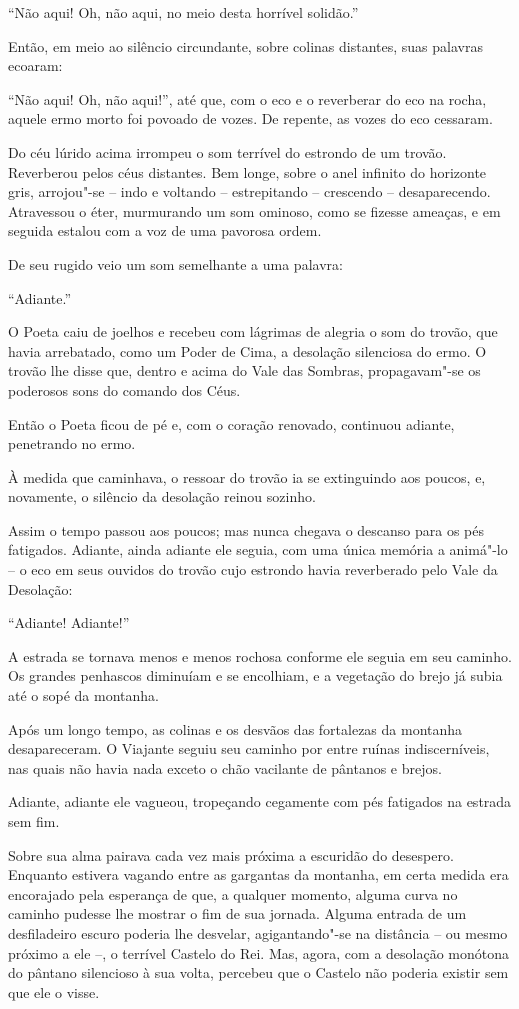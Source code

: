 ``Não aqui! Oh, não aqui, no meio desta horrível solidão.''

Então, em meio ao silêncio circundante, sobre colinas distantes, suas
palavras ecoaram:

``Não aqui! Oh, não aqui!'', até que, com o eco e o reverberar do eco na
rocha, aquele ermo morto foi povoado de vozes.
\smallskip
De repente, as vozes do eco cessaram.

Do céu lúrido acima irrompeu o som terrível do estrondo de um trovão.
Reverberou pelos céus distantes. Bem longe, sobre o anel infinito do
horizonte gris, arrojou"-se -- indo e voltando -- estrepitando --
crescendo -- desaparecendo. Atravessou o éter, murmurando um som
ominoso, como se fizesse ameaças, e em seguida estalou com a voz de uma
pavorosa ordem.

De seu rugido veio um som semelhante a uma palavra:

``Adiante.''

O Poeta caiu de joelhos e recebeu com lágrimas de alegria o som do
trovão, que havia arrebatado, como um Poder de Cima, a desolação
silenciosa do ermo. O trovão lhe disse que, dentro e acima do Vale das
Sombras, propagavam"-se os poderosos sons do comando dos Céus.

Então o Poeta ficou de pé e, com o coração renovado, continuou adiante,
penetrando no ermo.

À medida que caminhava, o ressoar do trovão ia se extinguindo aos
poucos, e, novamente, o silêncio da desolação reinou sozinho.

Assim o tempo passou aos poucos; mas nunca chegava o descanso para os pés
fatigados. Adiante, ainda adiante ele seguia, com uma única memória a
animá"-lo -- o eco em seus ouvidos do trovão cujo estrondo havia
reverberado pelo Vale da Desolação:

``Adiante! Adiante!''

A estrada se tornava menos e menos rochosa conforme ele seguia em
seu caminho. Os grandes penhascos diminuíam e se encolhiam, e a
vegetação do brejo já subia até o sopé da montanha.

Após um longo tempo, as colinas e os desvãos das fortalezas da montanha
desapareceram. O Viajante seguiu seu caminho por entre ruínas
indiscerníveis, nas quais não havia nada exceto o chão
vacilante de pântanos e brejos.

Adiante, adiante ele vagueou, tropeçando cegamente com pés fatigados na
estrada sem fim.

Sobre sua alma pairava cada vez mais próxima a escuridão do desespero.
Enquanto estivera vagando entre as gargantas da montanha, em certa
medida era encorajado pela esperança de que, a qualquer momento,
alguma curva no caminho pudesse lhe mostrar o fim de sua jornada. Alguma
entrada de um desfiladeiro escuro poderia lhe desvelar, agigantando"-se
na distância -- ou mesmo próximo a ele --, o terrível Castelo do Rei.
Mas, agora, com a desolação monótona do pântano silencioso à sua volta,
percebeu que o Castelo não poderia existir sem que ele o visse.

